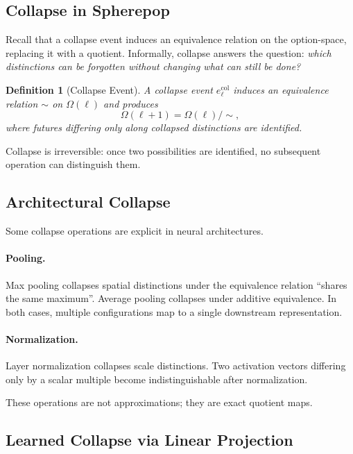 \documentclass[11pt]{article}
\newtheorem{definition}{Definition}
\theoremstyle{remark}
\begin{document}
\subsection{Collapse in Spherepop}

Recall that a collapse event induces an equivalence relation on the
option-space, replacing it with a quotient. Informally, collapse
answers the question: \emph{which distinctions can be forgotten without
changing what can still be done?}

\begin{definition}[Collapse Event]
A collapse event $e^{\mathrm{col}}_\ell$ induces an equivalence relation
$\sim$ on $\Omega(\ell)$ and produces
\[
\Omega(\ell+1) = \Omega(\ell) / {\sim},
\]
where futures differing only along collapsed distinctions are
identified.
\end{definition}

Collapse is irreversible: once two possibilities are identified, no
subsequent operation can distinguish them.

\subsection{Architectural Collapse}

Some collapse operations are explicit in neural architectures.

\paragraph{Pooling.}
Max pooling collapses spatial distinctions under the equivalence
relation ``shares the same maximum''. Average pooling collapses under
additive equivalence. In both cases, multiple configurations map to a
single downstream representation.

\paragraph{Normalization.}
Layer normalization collapses scale distinctions. Two activation
vectors differing only by a scalar multiple become indistinguishable
after normalization.

These operations are not approximations; they are exact quotient maps.

\subsection{Learned Collapse via Linear Projection}
\end{document}
